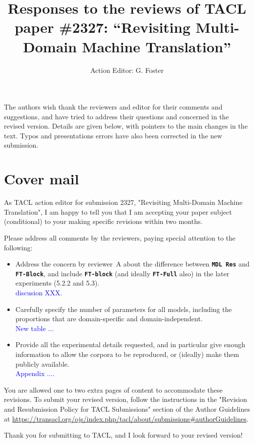 \documentclass[12pt,times,a4paper,twoside]{article}
\title{Responses to the reviews of TACL paper \#2327:
  ``Revisiting Multi-Domain Machine Translation''
}
\author{Action Editor: G. Foster}
\date{}
\theoremstyle{definition}
\newcommand{\system}[1]{\texttt{\textbf{#1}}}
\begin{document}
\maketitle

The authors wish thank the reviewers and editor for their comments and suggestions, and have tried to address their questions and concerned in the revised version. Details are given below, with pointers to the main changes in the text. Typos and presentations errors have also been corrected in the new submission.

\section*{Cover mail}
As TACL action editor for submission 2327, "Revisiting Multi-Domain Machine Translation", I am happy to tell you that I am accepting your paper subject (conditional) to your making specific revisions within two months.

Please address all comments by the reviewers, paying special attention to the following:
\begin{itemize}
\item Address the concern by reviewer~A about the difference between \system{MDL Res} and \system{FT-Block}, and include \system{FT-block} (and ideally \system{FT-Full} also) in the later experiments (5.2.2 and 5.3). \\
  \textcolor{blue}{discusion XXX.}
\item Carefully specify the number of parameters for all models, including the proportions that are domain-specific and domain-independent. \\
  \textcolor{blue}{New table ...}
\item Provide all the experimental details requested, and in particular give enough information to allow the corpora to be reproduced, or (ideally) make them publicly available.\\
  \textcolor{blue}{Appendix ....}
\end{itemize}

You are allowed one to two extra pages of content to accommodate these
revisions. To submit your revised version, follow the instructions in the
"Revision and Resubmission Policy for TACL Submissions" section of the
Author Guidelines at
\url{https://transacl.org/ojs/index.php/tacl/about/submissions\#authorGuidelines}.

Thank you for submitting to TACL, and I look forward to your revised
version! \\[2\parskip]
\end{document}

